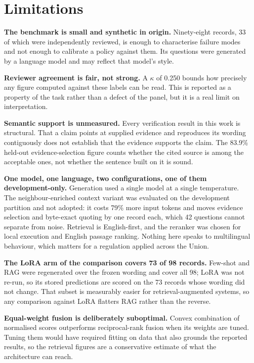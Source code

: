 \section{Limitations}

\textbf{The benchmark is small and synthetic in origin.} Ninety-eight records,
33 of which were independently reviewed, is enough to characterise failure modes
and not enough to calibrate a policy against them. Its questions were generated
by a language model and may reflect that model's style.

\textbf{Reviewer agreement is fair, not strong.} A $\kappa$ of 0.250 bounds how
precisely any figure computed against these labels can be read. This is reported
as a property of the task rather than a defect of the panel, but it is a real
limit on interpretation.

\textbf{Semantic support is unmeasured.} Every verification result in this work
is structural. That a claim points at supplied evidence and reproduces its wording
contiguously does not establish that the evidence supports the claim. The 83.9\%
held-out evidence-selection figure counts whether the cited source is among the
acceptable ones, not whether the sentence built on it is sound.

\textbf{One model, one language, two configurations, one of them development-only.}
Generation used a single model at a single temperature. The neighbour-enriched
context variant was evaluated on the development partition and not adopted: it
costs 79\% more input tokens and moves evidence selection and byte-exact quoting
by one record each, which 42 questions cannot separate from noise. Retrieval is English-first, and the reranker was
chosen for local execution and English passage ranking. Nothing here speaks to
multilingual behaviour, which matters for a regulation applied across the Union.

\textbf{The LoRA arm of the comparison covers 73 of 98 records.} Few-shot and
RAG were regenerated over the frozen wording and cover all 98; LoRA was not
re-run, so its stored predictions are scored on the 73 records whose wording did
not change. That subset is measurably easier for retrieval-augmented systems, so
any comparison against LoRA flatters RAG rather than the reverse.

\textbf{Equal-weight fusion is deliberately suboptimal.} Convex combination of
normalised scores outperforms reciprocal-rank fusion when its weights are tuned.
Tuning them would have required fitting on data that also grounds the reported
results, so the retrieval figures are a conservative estimate of what the
architecture can reach.

